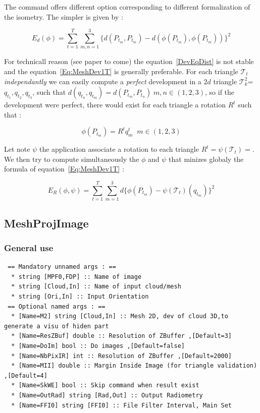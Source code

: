The command offers different option corresponding to different formalization of the isometry.
The simpler is given by :

\begin{equation}
   E_d(\phi) =   \sum_{t=1}^T \sum_{m,n=1}^3  \{ d(P_{t_m},P_{t_m})-  d(\phi(P_{t_m}),\phi(P_{t_m})) \}  ^2
   \label{DevEqDist}
\end{equation}

For technicall reason (see paper to come) the equation~\ref{DevEqDist} is not stable and
the equation~\ref{Eq:MeshDev1T} is generally preferable.
For each triangle  $\mathcal{T}_t$ \emph{independantly} we can easily compute a \emph{perfect} development
in a $2d$ triangle $\mathcal{T}^2_k$= $q_{t_1},q_{t_2},q_{t_3}$, such that 
$d(q_{t_n},q_{t_m})=d(P_{t_m},P_{t_n}) \; m,n \in (1,2,3)$, so if the development
were perfect, there would exist for each triangle a rotation $R^t$ such that :

\begin{equation}
	\phi(P_{t_m}) =  R^t q^t_m  \;\; m \in (1,2,3) \label{Eq:MeshDev1T}
\end{equation}


Let note $\psi$ the application associate a rotation to each triangle $R^t = \psi(\mathcal{T}_t)=$.
We then try to compute simultaneously the $\phi$ and $\psi$ that minizes globaly the 
formula of equation~\ref{Eq:MeshDev1T} :

\begin{equation}
    E_R(\phi,\psi)= \sum_{t=1}^T \sum_{m=1}^3  d\{\phi(P_{t_m}) - \psi(\mathcal{T}_t)(q_{t_m})\} ^2
\end{equation}


\subsection{MeshProjImage}

\subsubsection{General use}

\begin{verbatim}
 == Mandatory unnamed args : ==
  * string [MPF0,FDP] :: Name of image
  * string [Cloud,In] :: Name of input cloud/mesh
  * string [Ori,In] :: Input Orientation
 == Optional named args : ==
  * [Name=M2] string [Cloud,In] :: Mesh 2D, dev of cloud 3D,to generate a visu of hiden part 
  * [Name=ResZBuf] double :: Resolution of ZBuffer ,[Default=3]
  * [Name=DoIm] bool :: Do images ,[Default=false]
  * [Name=NbPixIR] int :: Resolution of ZBuffer ,[Default=2000]
  * [Name=MII] double :: Margin Inside Image (for triangle validation) ,[Default=4]
  * [Name=SkWE] bool :: Skip command when result exist
  * [Name=OutRad] string [Rad,Out] :: Output Radiometry 
  * [Name=FFI0] string [FFI0] :: File Filter Interval, Main Set
\end{verbatim}


